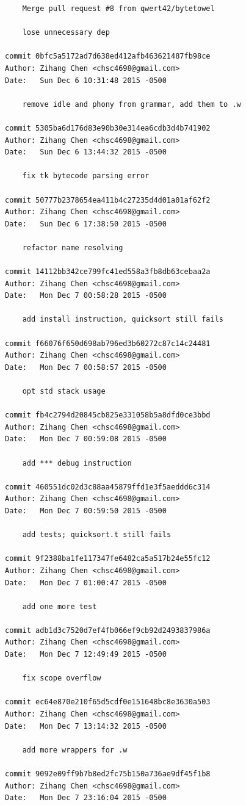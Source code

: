 \documentclass{report}
\begin{document}
\begin{appendices}
\begin{verbatim}
    Merge pull request #8 from qwert42/bytetowel
    
    lose unnecessary dep

commit 0bfc5a5172ad7d638ed412afb463621487fb98ce
Author: Zihang Chen <chsc4698@gmail.com>
Date:   Sun Dec 6 10:31:48 2015 -0500

    remove idle and phony from grammar, add them to .w

commit 5305ba6d176d83e90b30e314ea6cdb3d4b741902
Author: Zihang Chen <chsc4698@gmail.com>
Date:   Sun Dec 6 13:44:32 2015 -0500

    fix tk bytecode parsing error

commit 50777b2378654ea411b4c27235d4d01a01af62f2
Author: Zihang Chen <chsc4698@gmail.com>
Date:   Sun Dec 6 17:38:50 2015 -0500

    refactor name resolving

commit 14112bb342ce799fc41ed558a3fb8db63cebaa2a
Author: Zihang Chen <chsc4698@gmail.com>
Date:   Mon Dec 7 00:58:28 2015 -0500

    add install instruction, quicksort still fails

commit f66076f650d698ab796ed3b60272c87c14c24481
Author: Zihang Chen <chsc4698@gmail.com>
Date:   Mon Dec 7 00:58:57 2015 -0500

    opt std stack usage

commit fb4c2794d20845cb825e331058b5a8dfd0ce3bbd
Author: Zihang Chen <chsc4698@gmail.com>
Date:   Mon Dec 7 00:59:08 2015 -0500

    add *** debug instruction

commit 460551dc02d3c88aa45879ffd1e3f5aeddd6c314
Author: Zihang Chen <chsc4698@gmail.com>
Date:   Mon Dec 7 00:59:50 2015 -0500

    add tests; quicksort.t still fails

commit 9f2388ba1fe117347fe6482ca5a517b24e55fc12
Author: Zihang Chen <chsc4698@gmail.com>
Date:   Mon Dec 7 01:00:47 2015 -0500

    add one more test

commit adb1d3c7520d7ef4fb066ef9cb92d2493837986a
Author: Zihang Chen <chsc4698@gmail.com>
Date:   Mon Dec 7 12:49:49 2015 -0500

    fix scope overflow

commit ec64e870e210f65d5cdf0e151648bc8e3630a503
Author: Zihang Chen <chsc4698@gmail.com>
Date:   Mon Dec 7 13:14:32 2015 -0500

    add more wrappers for .w

commit 9092e09ff9b7b8ed2fc75b150a736ae9df45f1b8
Author: Zihang Chen <chsc4698@gmail.com>
Date:   Mon Dec 7 23:16:04 2015 -0500


\end{verbatim}
\end{appendices}
\end{document}
